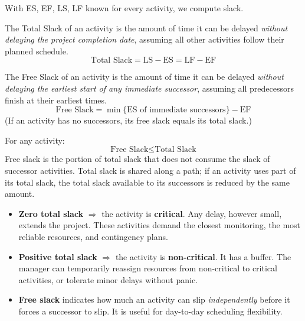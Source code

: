 \documentclass[11pt]{article}
\newcommand{\cle}[1]{{\popxbold\color{popdark}#1}}
\newcounter{popsec}
\newcounter{popsub}
\newcommand{\courssub}[1]{%
  \stepcounter{popsub}%
  \par\vspace{9pt}\noindent{\popxbold\fontsize{11.5}{13}\selectfont\color{popink}{\color{poporange}\thepopsec.\thepopsub}\hspace{6pt}#1}\par\nopagebreak\vspace{4pt}
}
\begin{document}
\courssub{Slack (Float): Total and Free}

With ES, EF, LS, LF known for every activity, we compute slack.

\begin{definition}
The \cle{Total Slack} of an activity is the amount of time it can be delayed \emph{without delaying the project completion date}, assuming all other activities follow their planned schedule.
\[ \text{Total Slack} = \text{LS} - \text{ES} = \text{LF} - \text{EF} \]
\end{definition}

\begin{definition}
The \cle{Free Slack} of an activity is the amount of time it can be delayed \emph{without delaying the earliest start of any immediate successor}, assuming all predecessors finish at their earliest times.
\[ \text{Free Slack} = \min\{\text{ES of immediate successors}\} - \text{EF} \]
(If an activity has no successors, its free slack equals its total slack.)
\end{definition}

\begin{propriete}
For any activity:
\[ \text{Free Slack} \le \text{Total Slack} \]
Free slack is the portion of total slack that does not consume the slack of successor activities. Total slack is shared along a path; if an activity uses part of its total slack, the total slack available to its successors is reduced by the same amount.
\end{propriete}

\begin{aretenir}
\begin{itemize}
    \item \textbf{Zero total slack} $\Rightarrow$ the activity is \textbf{critical}. Any delay, however small, extends the project. These activities demand the closest monitoring, the most reliable resources, and contingency plans.
    \item \textbf{Positive total slack} $\Rightarrow$ the activity is \textbf{non-critical}. It has a buffer. The manager can temporarily reassign resources from non-critical to critical activities, or tolerate minor delays without panic.
    \item \textbf{Free slack} indicates how much an activity can slip \emph{independently} before it forces a successor to slip. It is useful for day-to-day scheduling flexibility.
\end{itemize}
\end{aretenir}
\end{document}
